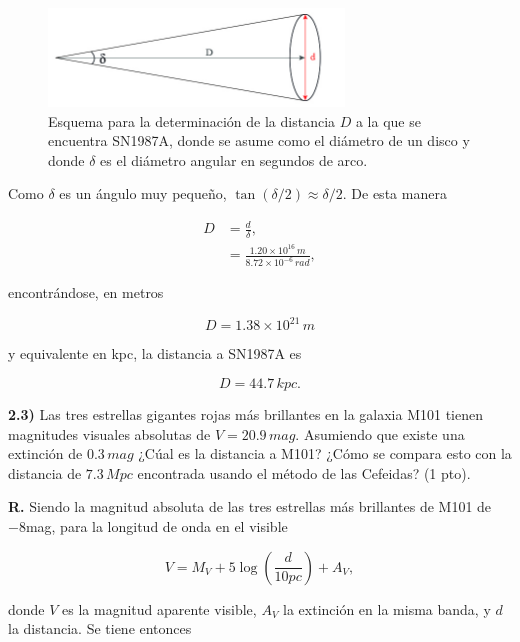 \documentclass[paper=a4, fontsize=10pt]{scrartcl} %
\begin{document}
\begin{figure}[h]
\begin{center}
\includegraphics[width=0.7\textwidth]{fig_7_SN}
\caption{\small{Esquema para la determinación de la distancia $D$ a la que se encuentra SN1987A, donde se asume {\color{red}{$d$}} como el diámetro de un disco y donde $\delta$ es el diámetro angular en segundos de arco.}}
\label{fig:2.3} 
\end{center}
\end{figure}


Como $\delta$ es un ángulo muy pequeño, $\tan(\delta/2) \approx \delta/2$. De esta manera 

\begin{align*}
D & = \frac{d}{\delta}, \\
& = \frac{1.20 \times 10^{16} \, m}{8.72 \times 10^{-6} \, rad},
\end{align*}

encontrándose, en metros 

$$ D = 1.38 \times 10^{21} \,m $$ 

y equivalente en kpc, la distancia a SN1987A es

\begin{equation} \label{eq:2.11}
D = 44. 7 \, kpc. 
\end{equation}


\vspace{0.3cm}  

{\bf{2.3)}} Las tres estrellas gigantes rojas más brillantes en la galaxia M101 tienen magnitudes visuales absolutas de $V=20.9 \, mag$. Asumiendo que existe una extinción de $0.3 \, mag$ ¿Cúal es la distancia
a M101? ¿Cómo se compara esto con la distancia de $7.3 \, Mpc$ encontrada usando el método de las Cefeidas? (1 pto).

{\bf{R.}} Siendo la magnitud absoluta de las tres estrellas más brillantes de M101 de $-8$mag, para la longitud de onda en el visible 

\begin{equation}
V = M_V + 5\log \left(\frac{d}{10pc} \right) + A_V,
\end{equation}

donde $V$ es la magnitud aparente visible, $A_V$ la extinción en la misma banda, y $d$ la distancia. Se tiene entonces 
\end{document}
